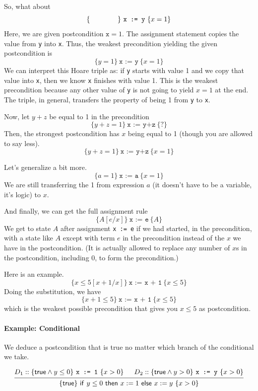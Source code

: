 \documentclass[11pt]{article}
\begin{document}
So, what about
\[
\{ \hspace*{4em} \} ~\texttt{x := y}~ \{ x = 1 \}
\]
Here, we are given postcondition $\mathtt{x} = 1$. The assignment statement copies the value from \texttt{y} into \texttt{x}.
Thus, the weakest precondition yielding the given postcondition is
\[
\{ y = 1 \} ~\texttt{x := y}~ \{ x = 1 \}
\]
We can interpret this Hoare triple as: if \texttt{y} starts with value 1 and we copy that value into \texttt{x}, then we know
\texttt{x} finishes with value 1. This is the weakest precondition because any other value of \texttt{y} is not going to yield
$x = 1$ at the end. The triple, in general, transfers the property of being 1 from \texttt{y} to \texttt{x}.

Now, let $y+z$ be equal to 1 in the precondition
\[
\{ y+z = 1 \} ~\texttt{x := y+z}~ \{ ? \}
\]
Then, the strongest postcondition has $x$ being equal to 1 (though you are allowed to say less).
\[
\{ y+z = 1 \} ~\texttt{x := y+z}~ \{ x = 1 \}
\]

Let's generalize a bit more.
\[
\{ a = 1 \} ~\texttt{x := a}~ \{ x = 1 \}
\]
We are still transferring the 1 from expression $a$ (it doesn't have to be a variable, it's logic) to $x$.

And finally, we can get the full assignment rule
\[
\{A[e/x]\}~\texttt{x := e}~\{A\}
\]
We get to state $A$ after assignment \texttt{x := e} if we had started, in the precondition, with a state like $A$ except with term $e$ in the precondition instead of the $x$ we have in the postcondition.
(It is actually allowed to replace any number of $x$s in the postcondition, including 0, to form the precondition.)

Here is an example.
\[
\{x \leq 5[x+1/x]\}~\texttt{x := x + 1}~\{ x \leq 5\}
\]
Doing the substitution, we have
\[
\{x+1 \leq 5\}~\texttt{x := x + 1}~\{ x \leq 5\}
\]
which is the weakest possible precondition that gives you $x \leq 5$ as postcondition.

\paragraph{Example: Conditional} We deduce a postcondition that is true no matter which branch of the conditional we take.

\[
\begin{prooftree}
  \hypo{D_1:: \{ \mathsf{true} \wedge y \leq 0 \} ~ \texttt{x := 1} ~ \{ x > 0 \}}
  \hypo{D_2:: \{ \mathsf{true} \wedge y > 0 \} ~ \texttt{x := y} ~ \{ x > 0 \}}
  \infer2{ \{ \mathsf{true} \} \mathsf{~if~} y \leq 0 \mathsf{~then~} x := 1 \mathsf{~else~} x := y ~ \{ x > 0 \}}
\end{prooftree}
\]
\end{document}
